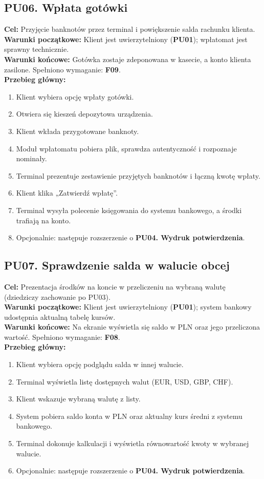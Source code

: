 \documentclass[12pt]{article}
\begin{document}
\subsection*{PU06. Wpłata gotówki}
\textbf{Cel:} Przyjęcie banknotów przez terminal i powiększenie salda rachunku klienta.\\
\textbf{Warunki początkowe:} Klient jest uwierzytelniony (\textbf{PU01}); wpłatomat jest sprawny technicznie.\\
\textbf{Warunki końcowe:} Gotówka zostaje zdeponowana w kasecie, a konto klienta zasilone. Spełniono wymaganie: \textbf{F09}.\\
\textbf{Przebieg główny:}
\begin{enumerate}
    \item Klient wybiera opcję wpłaty gotówki.
    \item Otwiera się kieszeń depozytowa urządzenia.
    \item Klient wkłada przygotowane banknoty.
    \item Moduł wpłatomatu pobiera plik, sprawdza autentyczność i rozpoznaje nominały.
    \item Terminal prezentuje zestawienie przyjętych banknotów i łączną kwotę wpłaty.
    \item Klient klika „Zatwierdź wpłatę”.
    \item Terminal wysyła polecenie księgowania do systemu bankowego, a środki trafiają na konto.
    \item Opcjonalnie: następuje rozszerzenie o \textbf{PU04. Wydruk potwierdzenia}.
\end{enumerate}

\subsection*{PU07. Sprawdzenie salda w walucie obcej}
\textbf{Cel:} Prezentacja środków na koncie w przeliczeniu na wybraną walutę (dziedziczy zachowanie po PU03).\\
\textbf{Warunki początkowe:} Klient jest uwierzytelniony (\textbf{PU01}); system bankowy udostępnia aktualną tabelę kursów.\\
\textbf{Warunki końcowe:} Na ekranie wyświetla się saldo w PLN oraz jego przeliczona wartość. Spełniono wymaganie: \textbf{F08}.\\
\textbf{Przebieg główny:}
\begin{enumerate}
    \item Klient wybiera opcję podglądu salda w innej walucie.
    \item Terminal wyświetla listę dostępnych walut (EUR, USD, GBP, CHF).
    \item Klient wskazuje wybraną walutę z listy.
    \item System pobiera saldo konta w PLN oraz aktualny kurs średni z systemu bankowego.
    \item Terminal dokonuje kalkulacji i wyświetla równowartość kwoty w wybranej walucie.
    \item Opcjonalnie: następuje rozszerzenie o \textbf{PU04. Wydruk potwierdzenia}.
\end{enumerate}
\end{document}
